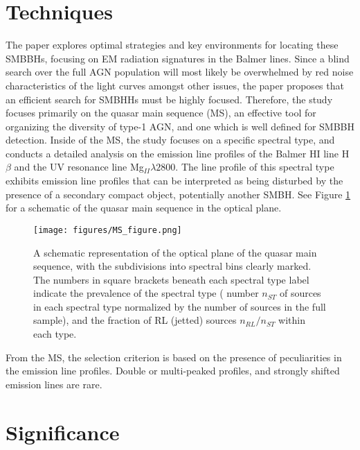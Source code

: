 \documentclass[12pt]{article}
\begin{document}
\section{Techniques}%

The paper explores optimal strategies and key environments for locating these SMBBHs, focusing on EM radiation signatures in the Balmer lines. Since a blind search over the full AGN population will most likely be overwhelmed by red noise characteristics of the light curves amongst other issues, the paper proposes that an efficient search for SMBHHs must be highly focused. Therefore, the study focuses primarily on the quasar main sequence (MS), an effective tool for organizing the diversity of type-1 AGN, and one which is well defined for SMBBH detection. Inside of the MS, the study focuses on a specific spectral type, and conducts a detailed analysis on the emission line profiles of the Balmer HI line H$\beta$ and the UV resonance line Mg$_{II} \lambda 2800$. The line profile of this spectral type exhibits emission line profiles that can be interpreted as being disturbed by the presence of a secondary compact object, potentially another SMBH. See Figure \ref{fig:ms_diagram} for a schematic of the quasar main sequence in the optical plane.

\begin{figure} [ht]
  \center
  \texttt{[image: figures/MS\_figure.png]}
  \caption{A schematic representation of the optical plane of the quasar main sequence, with the subdivisions into spectral bins clearly marked. The numbers in square brackets beneath each spectral type label indicate the prevalence of the spectral type ( number $n_{ST}$ of sources in each spectral type normalized by the number of sources in the full sample), and the fraction of RL (jetted) sources $n_{RL}/n_{ST}$ within each type.\supercite{marziani2025}}
  \label{fig:ms_diagram}
\end{figure}

From the MS, the selection criterion is based on the presence of peculiarities in the emission line profiles. Double or multi-peaked profiles, and strongly shifted emission lines are rare. 

\section{Significance}%
\end{document}
